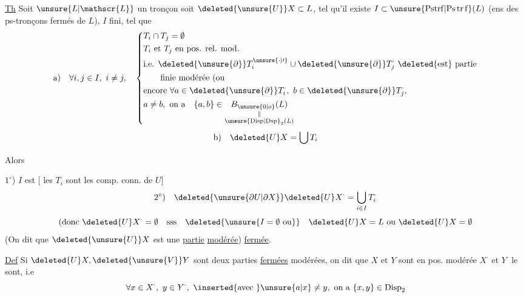\uline{Th} Soit $\unsure{L|\mathscr{L}}$ un tronçon \unsure{;|,} soit $\deleted{\unsure{U}}X\subset L$, tel qu'il existe $I\subset\unsure{\mathrm{Pstrf}|\mathrm{Ps\,tr\,f}}(L)$ (ens des ps-tronçons fermés de $L$), $I$ fini,  tel que
\[
\begin{aligned}
\text{a)}\quad \forall i,j\in I,\ i\ne j,\quad
\left\{\begin{aligned}
&T_i\cap T_j=\emptyset\\
&T_i\text{ et }T_j\text{ en pos. rel. mod.}\\
&\text{i.e. }\deleted{\unsure{\partial}}T_i^{\unsure{\cdot|\prime}}\cup \deleted{\unsure{\partial}}T_j^{\cdot}\ \text{\deleted{est} partie}\\
&\qquad\text{finie modérée (ou}\\
&\text{encore }\forall a\in\deleted{\unsure{\partial}}T_i^{\cdot},\ b\in\deleted{\unsure{\partial}}T_j^{\cdot},\\
&a\ne b,\ \text{on a}\quad\{a,b\}\in\underset{\substack{\Vert\\\unsure{\mathrm{Disp}|\mathrm{Dsp}}_2(L)}}{B_{\unsure{0|o}}(L)}
\end{aligned}\right.
\end{aligned}
\]
\[
\text{b)}\quad \deleted{U}X=\bigcup T_i
\]

Alors

$1^\circ$) $I$ est  [ les $T_i$ sont les comp. conn. de $U$]
\[
\text{$2^\circ$)}\quad \deleted{\unsure{\partial U|\partial X}}\deleted{U}X^{\cdot}=\bigcup_{i\in I}T_i^{\cdot}
\]
\[
(\text{donc }\deleted{U}X^{\cdot}=\emptyset\quad\text{sss}\quad\deleted{\unsure{I=\emptyset\ \text{ou}}}\quad\deleted{U}X=L\text{ ou }\deleted{U}X=\emptyset
\]
(On dit que $\deleted{\unsure{U}}X$ est une \uline{partie} \uline{modérée}) \uline{fermée}.

\uline{Def} Si $\deleted{U}X,\deleted{\unsure{V}}Y$ sont deux parties \uline{fermées} modérées, on dit que $X$ et $Y$ sont en pos.  modérée $X^{\cdot}$ et $Y^{\cdot}$ le sont, i.e
\[
\forall x\in X^{\cdot},\ y\in Y^{\cdot},\ \inserted{\text{avec }}\unsure{a|x}\ne y,\ \text{on a }\{x,y\}\in\mathrm{Disp}_2
\]

